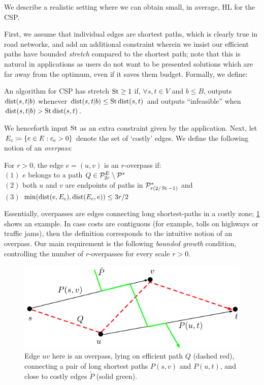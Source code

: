 We describe a realistic setting where we can obtain small, in average, HL for the CSP.

First, we assume that individual edges are shortest paths, which is clearly true in road networks, and add an additional constraint wherein we insist our efficient paths have bounded \emph{stretch} compared to the shortest path; note that this is natural in applications as users do not want to be presented solutions which are far away from the optimum, even if it saves them budget.
Formally, we define:

\begin{definition}[Stretch]
	An algorithm for CSP has stretch $\operatorname{St}\geq 1$ if, $\forall s,t\in V$ and $b\leq B$, outputs $\mbox{dist}(s,t|b)$ whenever $\mbox{dist}(s,t|b)\leq \operatorname{St}\mbox{dist}(s,t)$ and outputs ``infeasible'' when $\mbox{dist}(s,t|b)>\operatorname{St}\mbox{dist}(s,t)$.
\end{definition}
We henceforth input $\operatorname{St}$ as an extra constraint given by the application. 
Next, let $E_c\coloneqq\{e\in E:c_e>0\}$ denote the set of `costly' edges.
We define the following notion of an \emph{overpass}:

\begin{definition}[Overpass]
For $r>0$, the edge $e=(u,v)$ is an $r$-overpass if:\\
$(1)$ $e$ belongs to a path $Q\in\mathcal{P}^E_{2r}\setminus\mathcal{P}^*$\\
$(2)$ both $u$ and $v$ are endpoints of paths in $\mathcal{P}^*_{r(2/\operatorname{St}-1)}$ and\\ 
$(3)$ $\min(\mbox{dist}(e,E_c),\mbox{dist}(E_c,e))\leq 3r/2$
\end{definition} 
Essentially, overpasses are edges connecting long shortest-paths in a costly zone; \cref{fig:overpass} shows an example. In case costs are contiguous (for example, tolls on highways or traffic jams), then the definition corresponds to the intuitive notion of an overpass.
Our main requirement is the following \emph{bounded growth} condition, controlling the number of $r$-overpasses for every scale $r>0$.

\begin{figure}[!b]
	\includegraphics[scale=0.6]{TexImg/overpass.pdf}
	\caption{Edge $uv$ here is an overpass, lying on efficient path $Q$ (dashed red), connecting a pair of long shortest paths $P(s,v)$ and $P(u,t)$, and close to costly edges $\tilde P$ (solid green). } 
	\label{fig:overpass}
\end{figure}


